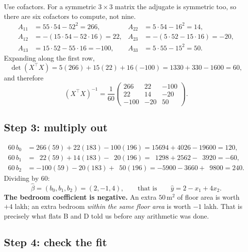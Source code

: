 \documentclass[11pt]{article}
\newcommand{\Xt}{X^{\!\top}}
\begin{document}
Use cofactors. For a symmetric $3\times3$ matrix the adjugate is symmetric
too, so there are six cofactors to compute, not nine.
\begin{align*}
  A_{11} &= 55\cdot54 - 52^2 = 266, &
  A_{22} &= 5\cdot54 - 16^2 = 14,\\
  A_{12} &= -(15\cdot54 - 52\cdot16) = 22, &
  A_{23} &= -(5\cdot52 - 15\cdot16) = -20,\\
  A_{13} &= 15\cdot52 - 55\cdot16 = -100, &
  A_{33} &= 5\cdot55 - 15^2 = 50 .
\end{align*}
Expanding along the first row,
\[
  \det(\Xt X) = 5(266) + 15(22) + 16(-100) = 1330 + 330 - 1600 = 60,
\]
and therefore
\begin{equation}
  \label{eq:inverse}
  (\Xt X)^{-1} = \frac{1}{60}
  \begin{pmatrix} 266 & 22 & -100\\ 22 & 14 & -20\\ -100 & -20 & 50
  \end{pmatrix}.
\end{equation}

\subsection{Step 3: multiply out}

\begin{worked}[$\hat\beta = (\Xt X)^{-1}\Xt y$, in integers]
\begin{align*}
  60\,b_0 &= 266(59) + 22(183) - 100(196) = 15694 + 4026 - 19600 = 120,\\
  60\,b_1 &= \phantom{2}22(59) + 14(183) - \phantom{1}20(196)
             = \phantom{1}1298 + 2562 - \phantom{1}3920 = -60,\\
  60\,b_2 &= -100(59) - 20(183) + \phantom{1}50(196)
             = -5900 - 3660 + \phantom{1}9800 = 240 .
\end{align*}
Dividing by $60$:
\[
  \hat\beta = (b_0, b_1, b_2) = (2, -1, 4),
  \qquad\text{that is}\qquad
  \hat y = 2 - x_1 + 4x_2 .
\]
\textbf{The bedroom coefficient is negative.} An extra $50\,\mathrm{m}^2$ of
floor area is worth $+4$ lakh; an extra bedroom \emph{within the same floor
area} is worth $-1$ lakh. That is precisely what flats B and D told us before
any arithmetic was done.
\end{worked}

\subsection{Step 4: check the fit}
\end{document}
